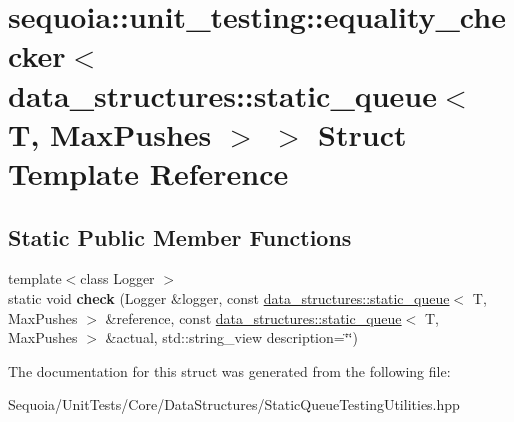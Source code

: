\hypertarget{structsequoia_1_1unit__testing_1_1equality__checker_3_01data__structures_1_1static__queue_3_01_t_00_01_max_pushes_01_4_01_4}{}\section{sequoia\+::unit\+\_\+testing\+::equality\+\_\+checker$<$ data\+\_\+structures\+::static\+\_\+queue$<$ T, Max\+Pushes $>$ $>$ Struct Template Reference}
\label{structsequoia_1_1unit__testing_1_1equality__checker_3_01data__structures_1_1static__queue_3_01_t_00_01_max_pushes_01_4_01_4}
\subsection*{Static Public Member Functions}
\begin{DoxyCompactItemize}
\item 
\mbox{\label{structsequoia_1_1unit__testing_1_1equality__checker_3_01data__structures_1_1static__queue_3_01_t_00_01_max_pushes_01_4_01_4_ae02e8b4cf5bcaf37bee0b66074c9c666}} 
{\footnotesize template$<$class Logger $>$ }\\static void {\bfseries check} (Logger \&logger, const \mbox{\hyperlink{classsequoia_1_1data__structures_1_1static__queue}{data\+\_\+structures\+::static\+\_\+queue}}$<$ T, Max\+Pushes $>$ \&reference, const \mbox{\hyperlink{classsequoia_1_1data__structures_1_1static__queue}{data\+\_\+structures\+::static\+\_\+queue}}$<$ T, Max\+Pushes $>$ \&actual, std\+::string\+\_\+view description=\char`\"{}\char`\"{})
\end{DoxyCompactItemize}


The documentation for this struct was generated from the following file\+:\begin{DoxyCompactItemize}
\item 
Sequoia/\+Unit\+Tests/\+Core/\+Data\+Structures/Static\+Queue\+Testing\+Utilities.\+hpp\end{DoxyCompactItemize}
